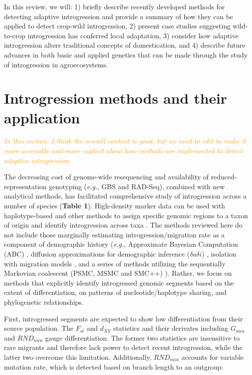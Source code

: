 \documentclass[11pt]{article}
\newcommand{\mbh}[1]{\textcolor{orange}{ \emph{\scriptsize  #1}} } %
\begin{document}
In this review, we will: 1) briefly describe recently developed methods for detecting adaptive introgression and provide a summary of how they can be applied to detect crop-wild introgression, 2) present case studies suggesting wild-to-crop introgression has conferred local adaptation, 3) consider how adaptive introgression alters traditional concepts of domestication, and 4) describe future advances in both basic and applied genetics that can be made through the study of introgression in agroecosystems.


\section*{Introgression methods and their application}

\mbh{In this section, I think the overall content is good, but we need to edit to make it more accessible and more explicit about how methods are implemented to detect adaptive introgression}

The decreasing cost of genome-wide resequencing and availability of reduced-representation genotyping (\emph{e.g.}, GBS and RAD-Seq), combined with new analytical methods, has facilitated comprehensive study of introgression across a number of species (\textbf{Table 1}).
High-density marker data can be used with haplotype-based and other methods to assign specific genomic regions to a taxon of origin and identify introgression across taxa \cite{Martin2015,Price2009,Lawson2012,pease2015,rosenzweig2016,geneva2015}.
The methods reviewed here do not include those marginally estimating introgression\slash migration rate as a component of demographic history (\emph{e.g.}, Approximate Bayesian Computation (ABC) \cite{beaumont2002}, diffusion approximations for demographic inference ($\delta a\delta i$) \cite{gutenkunst2009}, isolation with migration models \cite{hey2004}, and a series of methods utilizing the sequentially Markovian coalescent (PSMC, MSMC and SMC++) \cite{li2011, schiffels2014, terhorst2017}). 
Rather, we focus on methods that explicitly identify introgressed genomic segments based on the extent of differentiation, on patterns of nucleotide/haplotype sharing, and phylogenetic relationships.

First, introgressed segments are expected to show low differentiation from their source population.
The $F_{st}$ and $d_{XY}$ statistics and their derivates including $G_{min}$ \cite{geneva2015} and $RND_{min}$\cite{rosenzweig2016} gauge differentiation. 
The former two statistics are insensitive to rare migrants and therefore lack power to detect recent introgression, while the latter two overcome this limitation.
Additionally, $RND_{min}$ accounts for variable mutation rate, which is detected based on branch length to an outgroup: 
\end{document}
